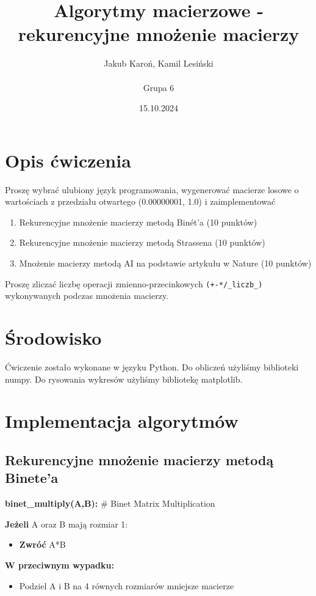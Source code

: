 \documentclass{article}
\title{Algorytmy macierzowe - rekurencyjne mnożenie macierzy}
\author{Jakub Karoń, Kamil Lesiński \\\\ Grupa 6}
\date{15.10.2024}
\begin{document}
\maketitle

\section{Opis ćwiczenia}
    Proszę wybrać ulubiony język programowania, wygenerować
    macierze losowe o wartościach z przedziału otwartego
    (0.00000001, 1.0) i zaimplementować
    \begin{enumerate}
        \item Rekurencyjne mnożenie macierzy metodą Binét’a (10 punktów)
        \item Rekurencyjne mnożenie macierzy metodą Strassena (10 punktów)
        \item Mnożenie macierzy metodą AI na podstawie artykułu w Nature (10 punktów)
    \end{enumerate}
    Proszę zliczać liczbę operacji zmienno-przecinkowych \verb|(+-*/_liczb_)| wykonywanych podczas mnożenia macierzy.

\section{Środowisko}
    Ćwiczenie zostało wykonane w języku Python. Do obliczeń użyliśmy biblioteki numpy. Do rysowania wykresów użyliśmy bibliotekę matplotlib.

\section{Implementacja algorytmów}
    \subsection{Rekurencyjne mnożenie macierzy metodą Binete'a}

        \textbf{binet\_multiply(A,B):} \hfill \# Binet Matrix Multiplication

        \textbf{Jeżeli} A oraz B mają rozmiar 1:
        \begin{itemize}
            \item \textbf{Zwróć} A*B
        \end{itemize}

        \textbf{W przeciwnym wypadku:}
        \begin{itemize}
            \item Podziel A i B na 4 równych rozmiarów mniejsze macierze
        \end{itemize}
\end{document}

